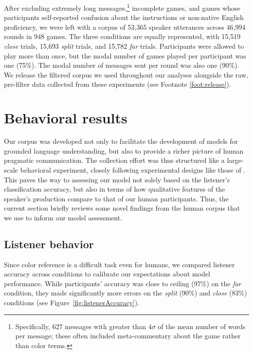 \documentclass[11pt,letterpaper]{article}
\renewcommand{\|}{\mid}
\newcommand{\figref}[1]{Figure~\ref{#1}}
\newcommand{\cond}{\emph}
\begin{document}
After excluding extremely long messages,\footnote{Specifically, 627 messages with greater than $4\sigma$ of the mean number of words per message; these often included meta-commentary about the game rather than color terms.} incomplete games, and games whose participants self-reported confusion about the instructions or non-native English proficiency, we were left with a corpus of 53,365 speaker utterances across 46,994 rounds in 948 games. The three conditions are equally represented, with 15,519 \emph{close} trials, 15,693 \emph{split} trials, and 15,782 \emph{far} trials. Participants were allowed to play more than once, but the modal number of games played per participant was one (75\%). The modal number of messages sent per round was also one (90\%). We release the filtered corpus we used throughout our analyses alongside the raw, pre-filter data collected from these experiments (see Footnote
\ref{foot:release}).

\section{Behavioral results}

Our corpus was developed not only to facilitate the development of
models for grounded language understanding, but also to provide a
richer picture of human pragmatic communication. The collection effort
was thus structured like a large-scale behavioral experiment, closely
following experimental designs like those of
. This paves the way to assessing our
model not solely based on the listener's classification accuracy, but also in terms of how
qualitative features of the speaker's production compare to that of our human participants.
Thus, the current section briefly reviews some novel findings from the human
corpus that we use to inform our model assessment.

\subsection{Listener behavior}

Since color reference is a difficult task even for humans, we compared listener accuracy across conditions to calibrate our expectations about model performance. While participants' accuracy was close to ceiling (97\%) on the \cond{far} condition, they made significantly more errors on the \cond{split} (90\%) and \cond{close} (83\%) conditions (see \figref{fig:listenerAccuracy}).
\end{document}
